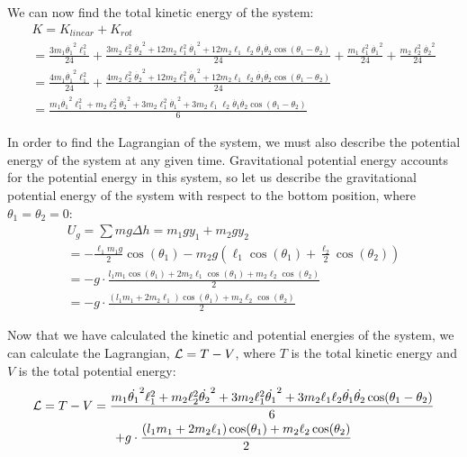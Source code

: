 \documentclass[]{article}
\begin{document}
We can now find the total kinetic energy of the system:
\begin{gather*}
	K = K_{linear} + K_{rot} \\
	= \frac{3m_1\dot{\theta_1}^2\ell_1^2}{24} + \frac{3m_2\ell_2^2\dot{\theta_2}^2 +12m_2\ell_1^2\dot{\theta_1}^2 + 12m_2\ell_1\ell_2\dot{\theta_1}\dot{\theta_2}\cos(\theta_1 - \theta_2)}{24} + \frac{m_1\ell_1^2\dot{\theta_1}^2}{24} + \frac{m_2\ell_2^2\dot{\theta_2}^2}{24} \\
	= \frac{4m_1\dot{\theta_1}^2\ell_1^2}{24} + \frac{4m_2\ell_2^2\dot{\theta_2}^2 +12m_2\ell_1^2\dot{\theta_1}^2 + 12m_2\ell_1\ell_2\dot{\theta_1}\dot{\theta_2}\cos(\theta_1 - \theta_2)}{24} \\
	= \frac{m_1\dot{\theta_1}^2\ell_1^2 + m_2\ell_2^2\dot{\theta_2}^2 + 3m_2\ell_1^2\dot{\theta_1}^2 + 3m_2\ell_1\ell_2\dot{\theta_1}\dot{\theta_2}\cos(\theta_1 - \theta_2)}{6}
\end{gather*}

In order to find the Lagrangian of the system, we must also describe the potential energy of the system at any given time. Gravitational potential energy accounts for the potential energy in this system, so let us describe the gravitational potential energy of the system with respect to the bottom position, where $\theta_1 = \theta_2 = 0$:
\begin{gather*}
	U_g = \sum mg\Delta h = m_1gy_1 + m_2gy_2 \\
	= -\frac{\ell_1m_1g}{2}\cos(\theta_1) - m_2g(\ell_1\cos(\theta_1) + \frac{\ell_2}{2}\cos(\theta_2)) \\
	= -g\cdot\frac{l_1m_1\cos(\theta_1) + 2m_2\ell_1\cos(\theta_1) + m_2\ell_2\cos(\theta_2)}{2} \\
	= -g\cdot\frac{(l_1m_1 + 2m_2\ell_1)\cos(\theta_1) + m_2\ell_2\cos(\theta_2)}{2}
\end{gather*}

Now that we have calculated the kinetic and potential energies of the system, we can calculate the Lagrangian, $\mathcal{L} = T - V$, where $T$ is the total kinetic energy and $V$ is the total potential energy:
\begin{gather*}
	\mathcal{L} = T - V = \frac{m_1\dot{\theta_1}^2\ell_1^2 + m_2\ell_2^2\dot{\theta_2}^2 + 3m_2\ell_1^2\dot{\theta_1}^2 + 3m_2\ell_1\ell_2\dot{\theta_1}\dot{\theta_2}\cos(\theta_1 - \theta_2)}{6} \\ + g\cdot\frac{(l_1m_1 + 2m_2\ell_1)\cos(\theta_1) + m_2\ell_2\cos(\theta_2)}{2}
\end{gather*}
\end{document}
